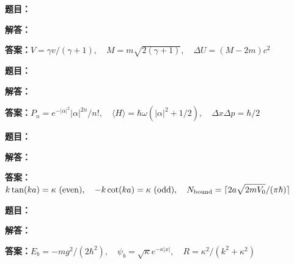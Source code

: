\documentclass[lang=cn,color=blue,11pt]{elegantbook}
\begin{document}
\par\smallskip\noindent\hrulefill\par\medskip
{}\par
\noindent\textbf{题目：}
\par\noindent\textbf{解答：}
\par\noindent\textbf{答案：}\(\displaystyle V=\gamma v/(\gamma+1),\quad M=m\sqrt{2(\gamma+1)},\quad\Delta U=(M-2m)c^2\)\par
\par\smallskip\noindent\hrulefill\par\medskip
{}\par
\noindent\textbf{题目：}
\par\noindent\textbf{解答：}
\par\noindent\textbf{答案：}\(\displaystyle P_n=e^{-|\alpha|^2}|\alpha|^{2n}/n!,\quad \langle H\rangle=\hbar\omega(|\alpha|^2+1/2),\quad\Delta x\Delta p=\hbar/2\)\par
\par\smallskip\noindent\hrulefill\par\medskip
{}\par
\noindent\textbf{题目：}
\par\noindent\textbf{解答：}
\par\noindent\textbf{答案：}\(\displaystyle k\tan(ka)=\kappa\ ({\rm even}),\quad -k\cot(ka)=\kappa\ ({\rm odd}),\quad N_{\rm bound}=\lceil2a\sqrt{2mV_0}/(\pi\hbar)\rceil\)\par
\par\smallskip\noindent\hrulefill\par\medskip
{}\par
\noindent\textbf{题目：}
\par\noindent\textbf{解答：}
\par\noindent\textbf{答案：}\(\displaystyle E_b=-mg^2/(2\hbar^2),\quad\psi_b=\sqrt\kappa e^{-\kappa|x|},\quad R=\kappa^2/(k^2+\kappa^2)\)\par
\end{document}
